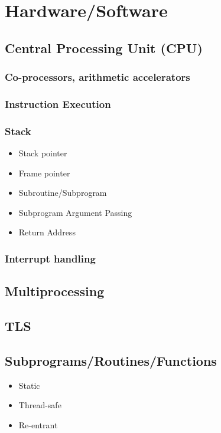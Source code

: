 \documentclass[12pt,a4paper]{article}
\begin{document}
\section{Hardware/Software}

\subsection{Central Processing Unit (CPU)}

\subsubsection{Co-processors, arithmetic accelerators}

\subsubsection{Instruction Execution}

\subsubsection{Stack}

\begin{itemize}
\item Stack pointer
\item Frame pointer
\item Subroutine/Subprogram
\item Subprogram Argument Passing
\item Return Address
\end{itemize}

\subsubsection{Interrupt handling}

\subsection{Multiprocessing}

\subsection{TLS}

\subsection{Subprograms/Routines/Functions}

\begin{itemize}
\item Static
\item Thread-safe
\item Re-entrant
\end{itemize}
\end{document}
